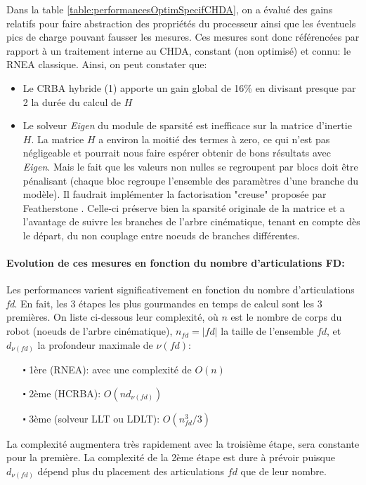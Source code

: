 \documentclass{report}
\begin{document}
Dans la table \ref{table:performancesOptimSpecifCHDA}, on a évalué des gains relatifs pour faire abstraction des propriétés du processeur ainsi que les éventuels pics de charge pouvant fausser les mesures. Ces mesures sont donc référencées par rapport à un traitement interne au CHDA, constant (non optimisé) et connu: le RNEA classique. Ainsi, on peut constater que:
\begin{itemize}
\item Le CRBA hybride (1) apporte un gain global de 16\% en divisant presque par 2 la durée du calcul de $H$
\item Le solveur \emph{Eigen} du module de sparsité est inefficace sur la matrice d'inertie $H$. La matrice $H$ a environ la moitié des termes à zero, ce qui n'est pas négligeable et pourrait nous faire espérer obtenir de bons résultats avec \emph{Eigen}.  Mais le fait que les valeurs non nulles se regroupent par blocs doit être pénalisant (chaque bloc regroupe l'ensemble des paramètres d'une branche du modèle). Il faudrait implémenter la factorisation "creuse" proposée par Featherstone \cite[p112]{bib_featherstone}. Celle-ci préserve bien la sparsité originale de la matrice et a l'avantage de suivre les branches de l'arbre cinématique, tenant en compte dès le départ, du non couplage entre noeuds de branches différentes.
\end{itemize}


\paragraph{Evolution de ces mesures en fonction du nombre d'articulations FD:}

Les performances varient significativement en fonction du nombre d'articulations \emph{fd}. En fait, les 3 étapes les plus gourmandes en temps de calcul sont les 3 premières. On liste ci-dessous leur complexité, où $n$ est le nombre de corps du robot (noeuds de l'arbre cinématique), $n_{fd}=|fd|$ la taille de l'ensemble $fd$, et $d_{\nu(fd)}$ la profondeur maximale de $\nu(fd)$:
\begin{itemize}
\item[$\centerdot$ 1ère (RNEA):] avec une complexité de $O(n)$
\item[$\centerdot$ 2ème (HCRBA):] $O(nd_{\nu(fd)})$
\item[$\centerdot$ 3ème (solveur LLT ou LDLT):] $O(n_{fd}^3/3)$
\end{itemize}
\noindent
La complexité augmentera très rapidement avec la troisième étape, sera constante pour la première. La complexité de la 2ème étape est dure à prévoir puisque $d_{\nu(fd)}$ dépend plus du placement des articulations $fd$ que de leur nombre.
\end{document}
